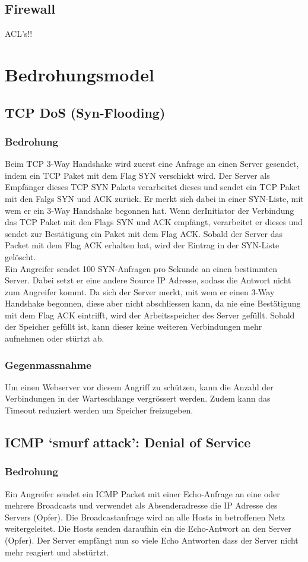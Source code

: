 \documentclass[11pt,a4paper,parskip=half]{scrartcl}
\begin{document}
\subsection{Firewall}
ACL's!!

\section{Bedrohungsmodel}
\subsection{TCP DoS (Syn-Flooding)}
\subsubsection{Bedrohung}
Beim TCP 3-Way Handshake wird zuerst eine Anfrage an einen Server gesendet, indem ein TCP Paket mit dem Flag SYN verschickt wird. Der Server als Empfänger dieses TCP SYN Pakets verarbeitet dieses und sendet ein TCP Paket mit den Falgs SYN und ACK zurück. Er merkt sich dabei in einer SYN-Liste, mit wem er ein 3-Way Handshake begonnen hat. Wenn derInitiator der Verbindung das TCP Paket mit den Flags SYN und ACK empfängt, verarbeitet er dieses und sendet zur Bestätigung ein Paket mit dem Flag ACK. Sobald der Server das Packet mit dem Flag ACK erhalten hat, wird der Eintrag in der SYN-Liste gelöscht.\\
Ein Angreifer sendet 100 SYN-Anfragen pro Sekunde an einen bestimmten Server. Dabei setzt er eine andere Source IP Adresse, sodass die Antwort nicht zum Angreifer kommt. Da sich der Server merkt, mit wem er einen 3-Way Handshake begonnen, diese aber nicht abschliessen kann, da nie eine Bestätigung mit dem Flag ACK eintrifft, wird der Arbeitsspeicher des Server gefüllt. Sobald der Speicher gefüllt ist, kann dieser keine weiteren Verbindungen mehr aufnehmen oder stürtzt ab.
\subsubsection{Gegenmassnahme}
Um einen Webserver vor diesem Angriff zu schützen, kann die Anzahl der Verbindungen in der Warteschlange vergrössert werden. Zudem kann das Timeout reduziert werden um Speicher freizugeben.

\subsection{ICMP ‘smurf attack’: Denial of Service}
\subsubsection{Bedrohung}
Ein Angreifer sendet ein ICMP Packet mit einer Echo-Anfrage an eine oder mehrere Broadcasts und verwendet als Absenderadresse die IP Adresse des Servers (Opfer). Die Broadcastanfrage wird an alle Hosts in betroffenen Netz weitergeleitet. Die Hosts senden daraufhin ein die Echo-Antwort an den Server (Opfer). Der Server empfängt nun so viele Echo Antworten dass der Server nicht mehr reagiert und abstürtzt.
\end{document}
